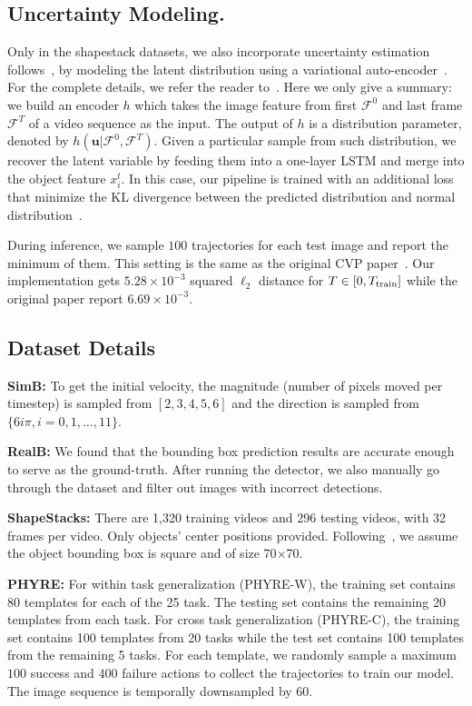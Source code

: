 \documentclass{article} \usepackage{iclr2021_conference,times}
\begin{document}
\subsection{Uncertainty Modeling.} \label{sec:appendix:cvp}

Only in the shapestack datasets, we also incorporate uncertainty estimation follows~\citep{ye2019cvp}, by modeling the latent distribution using a variational auto-encoder~\citep{kingma2013auto}. For the complete details, we refer the reader to~\citep{ye2019cvp}. Here we only give a summary: we build an encoder $h$ which takes the image feature from first $\mathcal{F}^{0}$ and last frame $\mathcal{F}^T$ of a video sequence as the input. The output of $h$ is a distribution parameter, denoted by $h(\mathbf{u}|\mathcal{F}^0, \mathcal{F}^T)$. Given a particular sample from such distribution, we recover the latent variable by feeding them into a one-layer LSTM and merge into the object feature $x_i^t$. In this case, our pipeline is trained with an additional loss that minimize the KL divergence between the predicted distribution and normal distribution~\citep{kingma2013auto}.

During inference, we sample $100$ trajectories for each test image and report the minimum of them. This setting is the same as the original CVP paper~\cite{ye2019cvp}. Our implementation gets $5.28\times 10^{-3}$ squared $\ell_2$ distance for $T\in [0, T_{\rm train}]$ while the original paper report $6.69\times 10^{-3}$.

\subsection{Dataset Details}

\textbf{SimB:} To get the initial velocity, the magnitude (number of pixels moved per timestep) is sampled from $[2, 3, 4, 5, 6]$ and the direction is sampled from $\{6i\pi, i = 0, 1, \dots, 11\}$.

\textbf{RealB:} We found that the bounding box prediction results are accurate enough to serve as the ground-truth. After running the detector, we also manually go through the dataset and filter out images with incorrect detections.

\textbf{ShapeStacks:} There are 1,320 training videos and 296 testing videos, with 32 frames per video. Only objects' center positions provided. Following~\citep{ye2019cvp}, we assume the object bounding box is square and of size 70$\times$70.

\textbf{PHYRE:} For within task generalization (PHYRE-W), the training set contains 80 templates for each of the 25 task. The testing set contains the remaining 20 templates from each task. For cross task generalization (PHYRE-C), the training set contains 100 templates from 20 tasks while the test set contains 100 templates from the remaining 5 tasks. For each template, we randomly sample a maximum $100$ success and $400$ failure actions to collect the trajectories to train our model. The image sequence is temporally downsampled by $60$. 
\end{document}
